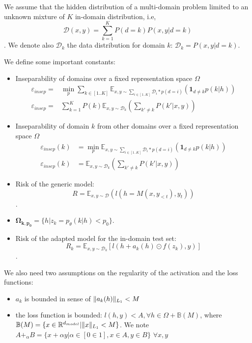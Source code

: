 \documentclass[12pt,times,a4paper,twoside]{article}
\newcommand{\fyTodo}[1]{\Todo[FY:]{\textcolor{orange}{#1}}}
\newcommand{\fyDone}[1]{\done[FY]\Todo[FY:]{\textcolor{orange}{#1}}}
\theoremstyle{definition}
\begin{document}
We assume that the hidden distribution of a multi-domain problem limited to an unknown mixture of $K$ in-domain distribution, i.e, $$\mathcal{D}(x,y) = \sum_{k=1}^{K} P(d=k) P(x,y|d=k)$$. We denote also $\mathcal{D}_k$ the data distribution for domain $k$: $\mathcal{D}_k = P(x,y|d=k)$.

We define some important constants:
\begin{itemize}
\item Inseparability of domains over a fixed representation space $\Omega$\fyTodo{ugly equation, is my version better ?}
\begin{align}
  \varepsilon_{insep} =& \min_{p} \sum_{k\in[1..K]} \mathbb{E}_{x,y \sim \sum_{i\in [1..K]} \mathcal{D}_{i}*p(d=i)}(\mathbf{1}_{d\neq k} p(k|h)) \\
  \varepsilon_{insep} =& \sum_{k=1}^K P(k)  \mathbb{E}_{x,y \sim \mathcal{D}_k} (\sum_{k' \neq k} P(k'|x,y))
\end{align}

\fyTodo{This does not depend on anything, this is how are data is but we can not know it} 
\item Inseparability of domain $k$ from other domains over a fixed representation space $\Omega$
  \begin{align}
    \varepsilon_{insep}(k) &= \min_{p} \mathbb{E}_{x,y \sim \sum_{i\in [1..K]} \mathcal{D}_{i}*p(d=i)}(\mathbf{1}_{d\neq k} p(k|h)) \\
    \varepsilon_{insep}(k) &= \mathbb{E}_{x,y \sim \mathcal{D}_k} (\sum_{k' \neq k} P(k'|x,y))    
  \end{align}
\item Risk of the generic model: $$R = \mathbb{E}_{x,y \sim\mathcal{D}}(l(h = M(x, y_{<t}), y_t))$$.\fyDone{wrt to which distribution ?}\fyTodo{is $x$ a sequence ? then we need to sum over $t$ to get the loss}
\item $\mathbf{\Omega_{k,p_{0}}} = \lbrace h | z_k = p_\theta(k|h) < p_0\rbrace$.
\item Risk of the adapted model for the in-domain test set:\fyTodo{Use same notations as before}
  $$R_k = \mathbb{E}_{x,y \sim \mathcal{D}_k} [l(h + a_k(h) \odot f(z_k), y)]$$.
\end{itemize}

We also need two assumptions on the regularity of the activation and the loss functions:\fyTodo{Are these standard in such models - if yes, cite}
\begin{itemize}
\item $a_k$ is bounded in sense of $\normL{a_k(h)} < M$\fyTodo{$M$ is already used}
\item the loss function is bounded:  $l(h,y) < A, \forall h \in \Omega + \mathbb{B}(M)$, where $\mathbb{B}(M)=\lbrace x\in \mathbb{R}^{d_{model}} | \normL{x}<M \rbrace$. We note $A +_{\alpha}B = \lbrace x+ \alpha y  | \alpha \in [0 \in 1], x \in A, y \in B \rbrace$ \fyTodo{Notation $A$ is a scalar, not a set}
  $\forall x,y$
\end{itemize}
\end{document}
